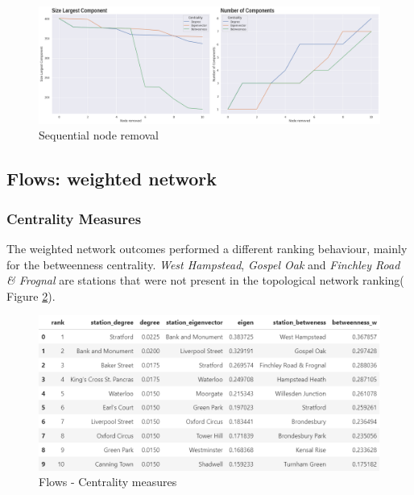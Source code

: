 \documentclass[10pt]{report}
\numberwithin{figure}{section}
\numberwithin{table}{section}
\begin{document}
    \begin{figure}[htp]
        \centering
        \includegraphics[width=16cm]{Image/Part1_sequential_Summarise.png}
        \caption{Sequential node removal}
        \label{fig:Part1_sequential_Summarise}
    \end{figure}


\newpage

\subsection{Flows: weighted network} 

\subsubsection{Centrality Measures } 

The weighted network outcomes performed a different ranking behaviour, mainly for the betweenness centrality. \textit{West Hampstead}, \textit{Gospel Oak} and \textit{Finchley Road \& Frognal} are stations that were not present in the topological network ranking( Figure \ref{fig:Table_CentralitiesMeasures_Flows}). 

    \begin{figure}[htp]
        \centering
        \includegraphics[width=14cm]{Image/Table_CentralitiesMeasures_Flows.png}
        \caption{Flows - Centrality measures}
        \label{fig:Table_CentralitiesMeasures_Flows}
    \end{figure}
\end{document}
